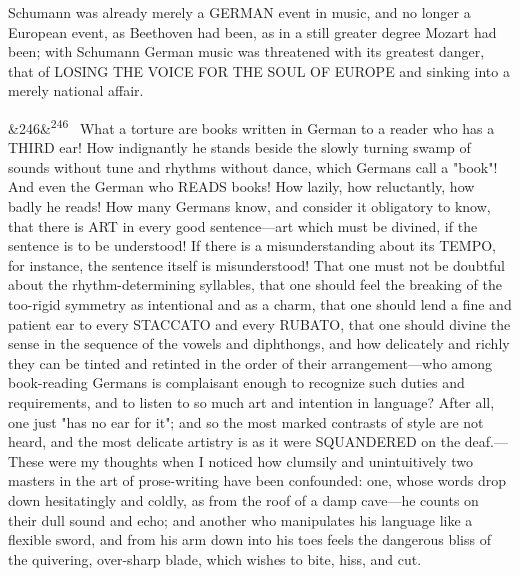 \documentclass[12pt]{article}
\newcommand{\para}[1][]{\par\noindent\ifx&#1&\else\textsuperscript{\footnotesize #1}~\fi}
\begin{document}
Schumann was already merely a GERMAN event in music, and no longer a European event, as Beethoven had been, as in a still greater degree Mozart had been; with Schumann German music was threatened with its greatest danger, that of LOSING THE VOICE FOR THE SOUL OF EUROPE and sinking into a merely national affair.

\para[246] What a torture are books written in German to a reader who has a THIRD ear! How indignantly he stands beside the slowly turning swamp of sounds without tune and rhythms without dance, which Germans call a "book"! And even the German who READS books! How lazily, how reluctantly, how badly he reads! How many Germans know, and consider it obligatory to know, that there is ART in every good sentence---art which must be divined, if the sentence is to be understood! If there is a misunderstanding about its TEMPO, for instance, the sentence itself is misunderstood! That one must not be doubtful about the rhythm-determining syllables, that one should feel the breaking of the too-rigid symmetry as intentional and as a charm, that one should lend a fine and patient ear to every STACCATO and every RUBATO, that one should divine the sense in the sequence of the vowels and diphthongs, and how delicately and richly they can be tinted and retinted in the order of their arrangement---who among book-reading Germans is complaisant enough to recognize such duties and requirements, and to listen to so much art and intention in language? After all, one just "has no ear for it"; and so the most marked contrasts of style are not heard, and the most delicate artistry is as it were SQUANDERED on the deaf.---These were my thoughts when I noticed how clumsily and unintuitively two masters in the art of prose-writing have been confounded: one, whose words drop down hesitatingly and coldly, as from the roof of a damp cave---he counts on their dull sound and echo; and another who manipulates his language like a flexible sword, and from his arm down into his toes feels the dangerous bliss of the quivering, over-sharp blade, which wishes to bite, hiss, and cut.
\end{document}
